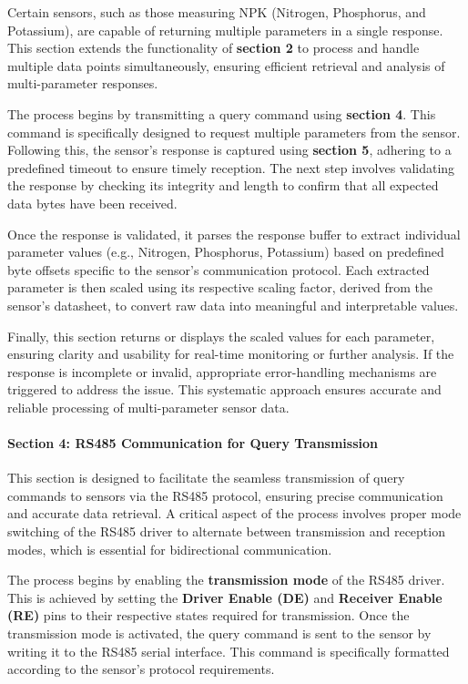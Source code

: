\documentclass{book} %
\begin{document}
\noindent Certain sensors, such as those measuring NPK (Nitrogen, Phosphorus, and Potassium), are capable of returning multiple parameters in a single response. This section extends the functionality of \textbf{section 2} to process and handle multiple data points simultaneously, ensuring efficient retrieval and analysis of multi-parameter responses.

\noindent The process begins by transmitting a query command using \textbf{section 4}. This command is specifically designed to request multiple parameters from the sensor. Following this, the sensor's response is captured using \textbf{section 5}, adhering to a predefined timeout to ensure timely reception. The next step involves validating the response by checking its integrity and length to confirm that all expected data bytes have been received.

\noindent Once the response is validated, it parses the response buffer to extract individual parameter values (e.g., Nitrogen, Phosphorus, Potassium) based on predefined byte offsets specific to the sensor's communication protocol. Each extracted parameter is then scaled using its respective scaling factor, derived from the sensor's datasheet, to convert raw data into meaningful and interpretable values.

\noindent Finally, this section returns or displays the scaled values for each parameter, ensuring clarity and usability for real-time monitoring or further analysis. If the response is incomplete or invalid, appropriate error-handling mechanisms are triggered to address the issue. This systematic approach ensures accurate and reliable processing of multi-parameter sensor data.

\noindent 

\noindent 
\paragraph{Section 4: RS485 Communication for Query Transmission}

\noindent This section is designed to facilitate the seamless transmission of query commands to sensors via the RS485 protocol, ensuring precise communication and accurate data retrieval. A critical aspect of the process involves proper mode switching of the RS485 driver to alternate between transmission and reception modes, which is essential for bidirectional communication.

\noindent The process begins by enabling the \textbf{transmission mode} of the RS485 driver. This is achieved by setting the \textbf{Driver Enable (DE)} and \textbf{Receiver Enable (RE)} pins to their respective states required for transmission. Once the transmission mode is activated, the query command is sent to the sensor by writing it to the RS485 serial interface. This command is specifically formatted according to the sensor's protocol requirements.
\end{document}
